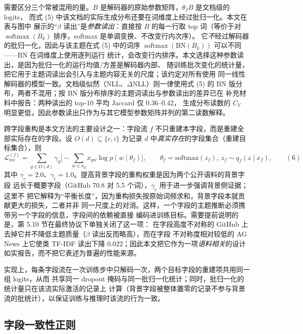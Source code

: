 \documentclass{article}
\begin{document}
需要区分三个常被混用的量。$B$ 是解码器的原始参数矩阵，$\theta_f B$ 是文档级的 logits，
而式 (5) 中该文档的实际生成分布还要在词维度上经过批归一化。本文在表与图中
展示的“$\beta$ 读出”是\emph{参数读出}：直接按 $B$ 的每一行取 top 词（等价于对
$\operatorname{softmax}(B_k)$ 排序，softmax 是单调变换、不改变行内次序）。
它\emph{不}经过解码器的批归一化，因此与该主题在式 (5) 中的词序
$\operatorname{softmax}(\mathrm{BN}(B_k))$ 可以不同——$\mathrm{BN}$ 在词维度上使用逐列运行
统计，会改变行内排序。本文选择这种参数读出，是因为批归一化的运行均值/方差是解码器内部、
随训练批次变化的统计量，把它用于主题词读出会引入与主题内容无关的尺度；该约定对所有使用
同一线性解码器的模型一致。文档级似然（NLL、$\Delta$NLL）则一律使用式 (5) 的
$\mathrm{BN}$ 版分布，两者不混用；按 BN 版分布排序的主题词读出与参数读出的差异已在
补充材料中报告：两种读出的 top-10 平均 Jaccard 仅 0.36--0.42，
生成分布读数的 $C_V$ 明显更低，因此参数读出只作为与其它模型参数矩阵并列的第二读数解释。

跨字段重构是本文方法的主要设计之一：字段流 $f$ 不只重建本字段，而是重建全部实际存在的字段。设
$O(d)\subseteq\{c,i\}$ 为记录 $d$ 中\emph{真实存在}的字段集合（重建目标集合），则
\begin{equation}
\mathcal{L}_{\mathrm{rec}}^{(f)}
=\sum_{g\in O(d)}\gamma_g\Big[-\sum_{w\in x_g}x_{gw}\log p(w\mid\theta_f)\Big],
\qquad \theta_f=\mathrm{softmax}(z_f),\ z_f\sim q_f(z\mid x_f),
\label{eq:lrec}
\qquad(6)\end{equation}
其中 $\gamma_c=2.0$、$\gamma_i=1.0$。提高背景字段的重构权重是因为两个公开语料的背景字段
远长于概要字段（GitHub 70.8 对 5.5 个词），$\gamma_c$ 用于进一步强调背景侧证据；这里不
把它解释为“平衡长度”，因为重构损失按原始词频求和，背景字段本就贡献更大的损失，二者并非
同一尺度上的对消。这样，一个字段的主题推断必须携带另一个字段的信息，字段间的依赖被直接
编码进训练目标。需要提前说明的是，第 5.10 节在最终协议下单独关闭了这一项：
在字段高度不对称的 GitHub 上去掉它并不降低主题质量（$\beta$ 读出反而略高），而在字段
不对称度相对较低的 AG News 上它使类 TF-IDF 读出下降 $0.022$；因此本文把它作为一项\emph{语料相关}的设计
如实报告，而不把它表述为普遍的性能来源。

实现上，每条字段流在一次训练步中只解码一次，两个目标字段的重建项共用同一组 logits，从而
共享同一 dropout 掩码与同一批归一化统计；同时，批归一化的统计量只在该流实际激活的记录上
计算（背景字段被整体置零的记录不参与背景流的批统计），以保证训练与推理时该流的行为一致。

\subsection{字段一致性正则}
\end{document}
